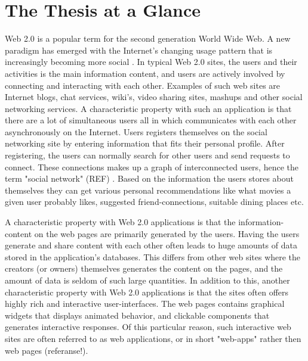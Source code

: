 \chapter{The Thesis at a Glance}     %

Web 2.0 is a popular term for the second generation World Wide Web. A new paradigm has emerged with the Internet's changing usage pattern that is increasingly becoming more social \cite{web20}. In typical Web 2.0 sites, the users and their activities is the main information content, and users are actively involved by connecting and interacting with each other. Examples of such web sites are Internet blogs, chat services, wiki's, video sharing sites, mashups and other social networking services. A characteristic property with such an application is that there are a lot of simultaneous users all in which communicates with each other asynchronously on the Internet. Users registers themselves on the social networking site by entering information that fits their personal profile. After registering, the users can normally search for other users and send requests to connect. These connections makes up a graph of interconnected users, hence the term "social network" (REF) . Based on the information the users stores about themselves they can get various personal recommendations like what movies a given user probably likes, suggested friend-connections, suitable dining places etc. 
                
A characteristic property with Web 2.0 applications is that the information-content on the web pages are primarily generated by the users. Having the users generate and share content with each other often leads to huge amounts of data stored in the application's databases. This differs from other web sites where the creators (or owners) themselves generates the content on the pages, and the amount of data is seldom of such large quantities. In addition to this, another characteristic property with Web 2.0 applications is that the sites often offers highly rich and interactive user-interfaces. The web pages contains graphical widgets that displays animated behavior, and clickable components that generates interactive responses. Of this particular reason, such interactive web sites are often referred to as web applications, or in short "web-apps" rather then web pages (referanse!). 
                

